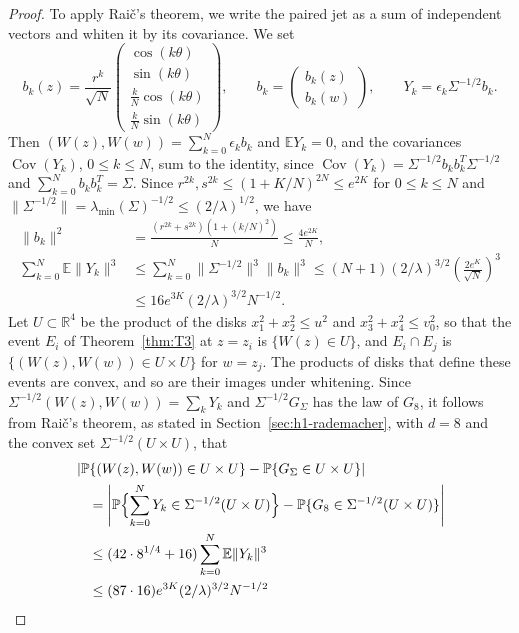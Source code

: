 \begin{proof}
To apply Rai\v{c}'s theorem, we write the paired jet as a sum of
independent vectors and whiten it by its covariance. We set
\[
 b_k(z)=\frac{r^k}{\sqrt N}
 \begin{pmatrix}\cos(k\theta)\\\sin(k\theta)\\
 \frac kN\cos(k\theta)\\\frac kN\sin(k\theta)\end{pmatrix},\qquad
 b_k=\begin{pmatrix}b_k(z)\\b_k(w)\end{pmatrix},\qquad
 Y_k=\epsilon_k\Sigma^{-1/2}b_k.
\]
Then $(W(z),W(w))=\sum_{k=0}^N\epsilon_kb_k$ and $\mathbb EY_k=0$,
and the covariances $\operatorname{Cov}(Y_k)$, $0\le k\le N$, sum to the
identity, since
$\operatorname{Cov}(Y_k)=\Sigma^{-1/2}b_kb_k^T\Sigma^{-1/2}$ and
$\sum_{k=0}^Nb_kb_k^T=\Sigma$.
Since $r^{2k},s^{2k}\le(1+K/N)^{2N}\le e^{2K}$ for $0\le k\le N$ and
$\|\Sigma^{-1/2}\|=\lambda_{\min}(\Sigma)^{-1/2}\le(2/\lambda)^{1/2}$, we
have
\begin{align*}
 \|b_k\|^2&=\frac{(r^{2k}+s^{2k})(1+(k/N)^2)}N
 \le\frac{4e^{2K}}N,\\
 \sum_{k=0}^N\mathbb E\|Y_k\|^3
 &\le\sum_{k=0}^N\|\Sigma^{-1/2}\|^3\|b_k\|^3
 \le(N+1)(2/\lambda)^{3/2}
       \left(\frac{2e^K}{\sqrt N}\right)^3\\
 &\le16e^{3K}(2/\lambda)^{3/2}N^{-1/2}.
\end{align*}
Let $U\subset\mathbb R^4$ be the product of the disks
$x_1^2+x_2^2\le u^2$ and $x_3^2+x_4^2\le v_0^2$, so that the event $E_i$
of Theorem~\ref{thm:T3} at $z=z_i$ is $\{W(z)\in U\}$, and $E_i\cap E_j$
is $\{(W(z),W(w))\in U\times U\}$ for $w=z_j$.
The products of disks that define these events are convex, and so are their
images under whitening. Since $\Sigma^{-1/2}(W(z),W(w))=\sum_kY_k$ and
$\Sigma^{-1/2}G_\Sigma$ has the law of $G_8$, it follows from Rai\v{c}'s
theorem, as stated in Section~\ref{sec:h1-rademacher}, with $d=8$ and the
convex set $\Sigma^{-1/2}(U\times U)$, that
\begin{align*}
 &\left|\Prob\{(W(z),W(w))\in U\times U\}-\Prob\{G_\Sigma\in U\times U\}\right|\\
 &\quad=\left|\Prob\Bigl\{\sum_{k=0}^NY_k\in\Sigma^{-1/2}(U\times U)\Bigr\}
   -\Prob\{G_8\in\Sigma^{-1/2}(U\times U)\}\right|\\
 &\quad\le(42\cdot8^{1/4}+16)\sum_{k=0}^N\mathbb E\|Y_k\|^3\\
 &\quad\le(87\cdot16)e^{3K}(2/\lambda)^{3/2}N^{-1/2}

\end{align*}
\end{proof}
